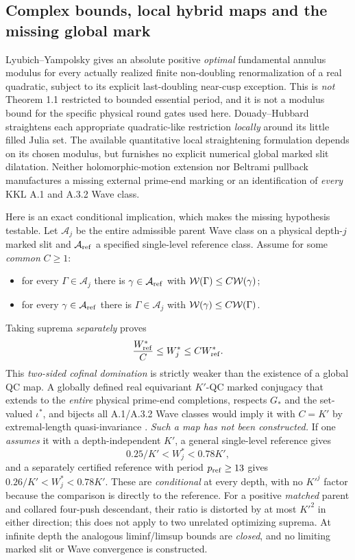 \subsection{Complex bounds, local hybrid maps and the missing global mark}
Lyubich--Yampolsky
\cite[p.~1220, Complex Bounds Theorem]{LyubichYampolsky1997}
gives an absolute positive
\emph{optimal} fundamental
annulus modulus for
every actually realized
finite non-doubling
renormalization of a real
quadratic, subject to its
explicit last-doubling
near-cusp exception.
This is \emph{not}
Theorem 1.1 restricted
to bounded essential period,
and it is not a modulus
bound for the specific
physical round gates
used here.
Douady--Hubbard
\cite[Theorem 1]{DH1985}
straightens each
appropriate quadratic-like
restriction \emph{locally}
around its little filled
Julia set.  The available
quantitative local
straightening formulation
\cite[Lemma 4.33]{LyubichNotes}
depends on its chosen
modulus, but furnishes
no explicit numerical
global marked slit
dilatation.  Neither
holomorphic-motion
extension
\cite{BersRoyden1986,Slodkowski1991}
nor Beltrami pullback
manufactures a missing
external prime-end marking
or an identification of
\emph{every} KKL A.1
and A.3.2 Wave class.

Here is an exact
conditional implication,
which makes the missing
hypothesis testable.
Let $\mathcal A_j$ be
the entire admissible
parent Wave class
on a physical depth-$j$
marked slit and
$\mathcal A_{\rm ref}$
a specified single-level
reference class.  Assume
for some \emph{common}
$C\ge1$:
\begin{itemize}
\item for every $\Gamma\in\mathcal A_j$
there is $\gamma\in\mathcal A_{\rm ref}$
with $\mathcal W(\Gamma)\le C\mathcal W(\gamma)$;
\item for every $\gamma\in\mathcal A_{\rm ref}$
there is $\Gamma\in\mathcal A_j$
with $\mathcal W(\gamma)\le C\mathcal W(\Gamma)$.
\end{itemize}
Taking suprema \emph{separately}
proves
\begin{equation}\label{eq:depth}
 \frac{W_{\rm ref}^*}{C}
 \le W_j^*\le C W_{\rm ref}^*.
\end{equation}
This \emph{two-sided
cofinal domination}
is strictly weaker than
the existence of a
global QC map.  A
globally defined real
equivariant $K'$-QC
marked conjugacy that
extends to the \emph{entire}
physical prime-end
completions, respects
$G_*$ and the set-valued
$\iota^*$, and
bijects all A.1/A.3.2
Wave classes would
imply it with $C=K'$
by extremal-length
quasi-invariance
\cite{AhlforsQC1966}.
\emph{Such a map has
not been constructed.}
If one \emph{assumes}
it with a depth-independent
$K'$, a general
single-level reference
gives
\[
 0.25/K'<W_j^*<0.78K',
\]
and a separately certified
reference with period
$p_{\rm ref}\ge13$ gives
$0.26/K'<W_j^*<0.78K'$.
These are \emph{conditional}
at every depth, with no
$K'^j$ factor because
the comparison is directly
to the reference.
For a positive \emph{matched}
parent and collared
four-push descendant,
their ratio is distorted
by at most $K'^2$
in either direction;
this does not apply
to two unrelated
optimizing suprema.
At infinite depth the
analogous liminf/limsup
bounds are \emph{closed},
and no limiting marked
slit or Wave convergence
is constructed.

